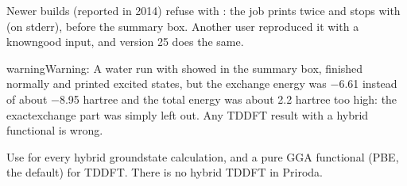 \documentclass[letterpaper,10pt,english,openany,oneside]{sphinxmanual}
\begin{document}
\sphinxAtStartPar
Newer builds (reported in 2014) refuse with : the job prints  twice and stops with
 (on stderr), before the summary box. Another user
reproduced it with a known\sphinxhyphen{}good input, and version 25 does the same.



\begin{sphinxadmonition}{warning}{Warning:}
\sphinxAtStartPar
{} A water run with  showed  in the
summary box, finished normally and printed excited states, but the exchange energy was −6.61 instead of about
−8.95 hartree and the total energy was about 2.2 hartree too high: the exact\sphinxhyphen{}exchange part was simply left out. Any
TDDFT result with a hybrid functional is wrong.
\end{sphinxadmonition}



\sphinxAtStartPar
{} Use  for every hybrid ground\sphinxhyphen{}state calculation, and a pure GGA functional (PBE, the default)
for TDDFT. There is no hybrid TDDFT in Priroda.
\end{document}
